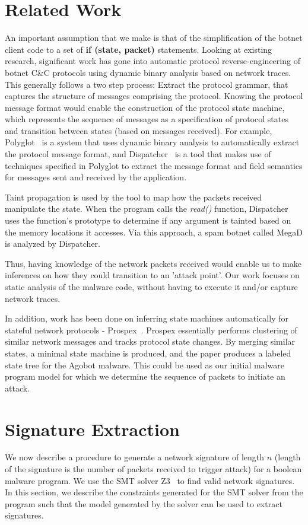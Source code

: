\documentclass[]{article}
\begin{document}
\section{Related Work}
An important assumption that we make is that of the simplification of the botnet client code to a set of \textbf {if (state, packet)} statements. Looking at existing research, significant work has gone into automatic protocol reverse-engineering of botnet C\&C protocols using dynamic binary analysis based on network traces. This generally follows a two step process: Extract the protocol grammar, that captures the structure of messages comprising the protocol. Knowing the protocol message format would enable the construction of the protocol state machine, which represents the sequence of messages as a specification of protocol states and transition between states (based on messages received). 
For example, Polyglot~\cite{polyglot} is a system that uses dynamic binary analysis to automatically extract the protocol message format, and Dispatcher~\cite{dispatcher} is a tool that makes use of techniques specified in Polyglot to extract the message format and field semantics for messages sent and received by the application.

Taint propagation is used by the tool to map how the packets received manipulate the state. When the program calls the \textit{read()} function, Dispatcher uses the function's prototype to determine if any argument is tainted based on the memory locations it accesses. Via this approach, a spam botnet called MegaD is analyzed by Dispatcher.

Thus, having knowledge of the network packets received would enable us to make inferences on how they could transition to an 'attack point'. Our work focuses on static analysis of the malware code, without having to execute it and/or capture network traces.

In addition, work has been done on inferring state machines automatically for stateful network protocols - Prospex~\cite{prospex}. Prospex essentially performs clustering of similar network messages and tracks protocol state changes. By merging similar states, a minimal state machine is produced, and the paper produces a labeled state tree for the Agobot malware. This could be used as our initial malware program model for which we determine the sequence of packets to initiate an attack.

\section{Signature Extraction} \label{sec:extraction}
We now describe a procedure to generate a network signature
of length $n$ (length of the signature is the number of packets
received to trigger attack) for a boolean malware program. 
We use the SMT solver Z3~\cite{z3}
to find valid network signatures. In this section, we describe
the constraints generated for the SMT solver from the program
such that the model generated by the solver can be used to 
extract signatures. 
\end{document}
